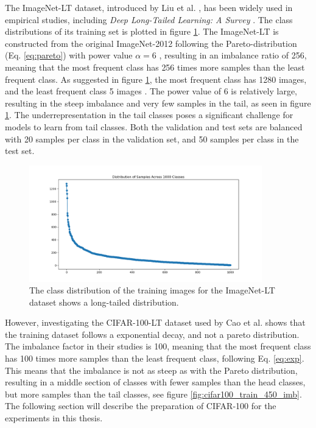The ImageNet-LT dataset, introduced by Liu et al. \cite{liu2019largescalelongtailedrecognitionopen}, has been widely used in empirical studies, including \textit{Deep Long-Tailed Learning: A Survey} \cite{zhang2023deep}. The class distributions of its training set is plotted in figure \ref{fig:IN-train}. The ImageNet-LT is constructed from the original ImageNet-2012 following the Pareto-distribution (Eq. \eqref{eq:pareto}) with power value $\alpha=6$ \cite{liu2019largescalelongtailedrecognitionopen}, resulting in an imbalance ratio of 256, meaning that the most frequent class has 256 times more samples than the least frequent class. As suggested in figure \ref{fig:IN-train}, the most frequent class has 1280 images, and the least frequent class 5 images \cite{liu2019largescalelongtailedrecognitionopen}. The power value of 6 is relatively large, resulting in the steep imbalance and very few samples in the tail, as seen in figure \ref{fig:IN-train}. The underrepresentation in the tail classes poses a significant challenge for models to learn from tail classes. Both the validation and test sets are balanced with 20 samples per class in the validation set, and 50 samples per class in the test set. 


\begin{figure}[h!]
    \centering
    \includegraphics[width=0.9\textwidth]{Images/Plots/class_distribution_train.png}
    \caption{The class distribution of the training images for the ImageNet-LT dataset shows a long-tailed distribution.}
    \label{fig:IN-train}
\end{figure}


However, investigating the CIFAR-100-LT dataset used by Cao et al. \cite{cao2019learningimbalanceddatasetslabeldistributionaware} shows that the training dataset follows a exponential decay, and not a pareto distribution. The imbalance factor in their studies is 100, meaning that the most frequent class has 100 times more samples than the least frequent class, following Eq. \eqref{eq:exp}. This means that the imbalance is not as steep as with the Pareto distribution, resulting in a middle section of classes with fewer samples than the head classes, but more samples than the tail classes, see figure \ref{fig:cifar100_train_450_imb}. The following section will describe the preparation of CIFAR-100 for the experiments in this thesis.


